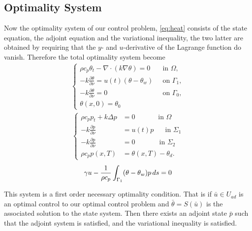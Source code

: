 \subsection{Optimality System}
Now the optimality system of our control problem, \eqref{eq:heat} consists of the state equation, the adjoint equation and the variational inequality, the two latter are obtained by requiring that the $y$- and $u$-derivative of the Lagrange function do vanish. Therefore the total optimality system become
%
\begin{align*}
    \begin{cases}
     \rho c_p \theta_t - \nabla \cdot (k \nabla \theta) = 0 \quad & \text{in $\Omega$}, \\
      -k \frac{\partial \theta}{\partial \nu} = u(t) (\theta - \theta_w) &\text{on } \Gamma_1, \\
      -k \frac{\partial \theta}{\partial \nu} = 0  &\text{on } \Gamma_0, \\
      \theta(x, 0) = \theta_0 
      \end{cases}
      \end{align*}
      \begin{align*}
      \begin{cases}
       \rho c_p p_t + k\Delta p &= 0 \quad\qquad\textrm{ in } \Omega \\
      -k\frac{\partial p}{\partial\nu} &= u(t)p \,\,\quad\textrm{ in } \Sigma_1 \\
      -k\frac{\partial p}{\partial\nu} &= 0 \,\quad\qquad\textrm{ in } \Sigma_2 \\
      \rho c_p p(x, T) &= \theta(x, T) - \theta_d.
      \end{cases}
      \end{align*}
\begin{equation*}
      \gamma u - \frac{1}{\rho c_p} \int_{\Gamma_1} (\theta - \theta_w)p \mathop{ds} =0
\end{equation*}

This system is a first order necessary optimality condition. That is if $\bar{u} \in U_{ad}$ is an optimal control to our optimal control problem and $\bar{\theta} = S(\bar{u})$ is the associated solution to the state system. Then there exists an adjoint state $\bar{p}$ such that the adjoint system is satisfied, and the variational inequality is satisfied. 



\iffalse
Now one can restate this optimalilty system using the projection formula if one assume box-constraints. That is, if we assume
\begin{equation*}
    U_{\mathrm{ad}} := \{ u \in L^2(\Sigma_1): u_a(x,t) \leq u(x,t) \leq u_b(x,t) \text{ for a.e. } (x,t) \in \Sigma_1 \},
\end{equation*}
then a control $\bar{u} \in U_{\mathrm{ad}}$ and the associated state $\bar{\theta}$ is optimal if and only if it satisfy together with the adjoint state $p$ solving \eqref{eq:adjoint-eqn}  and $\gamma >0$ i.e. the regularisation parameter is positive that
\fi

